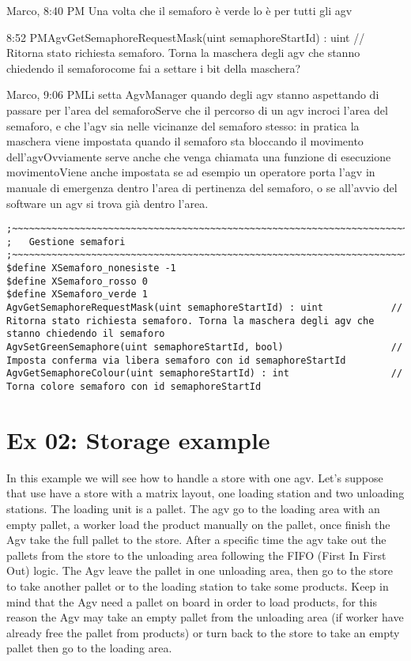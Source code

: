 Marco, 
8:40 PM Una volta che il semaforo è verde lo è per tutti gli agv

8:52 PMAgvGetSemaphoreRequestMask(uint semaphoreStartId) : uint	// Ritorna stato richiesta semaforo. Torna la maschera degli agv che stanno chiedendo il semaforocome fai a settare i bit della maschera?

Marco, 
9:06 PMLi setta AgvManager quando degli agv stanno aspettando di passare per l'area del semaforoServe che il percorso di un agv incroci l'area del semaforo, e che l'agv sia nelle vicinanze del semaforo stesso: in pratica la maschera viene impostata quando il semaforo sta bloccando il movimento dell'agvOvviamente serve anche che venga chiamata una funzione di esecuzione movimentoViene anche impostata se ad esempio un operatore porta l'agv in manuale di emergenza dentro l'area di pertinenza del semaforo, o se all'avvio del software un agv si trova già dentro l'area.

\begin{lstlisting}[caption= Semaphores functions and constants]
;~~~~~~~~~~~~~~~~~~~~~~~~~~~~~~~~~~~~~~~~~~~~~~~~~~~~~~~~~~~~~~~~~~~~~~~~~~~~~~~
;	Gestione semafori
;~~~~~~~~~~~~~~~~~~~~~~~~~~~~~~~~~~~~~~~~~~~~~~~~~~~~~~~~~~~~~~~~~~~~~~~~~~~~~~~
$define XSemaforo_nonesiste -1
$define XSemaforo_rosso 0
$define XSemaforo_verde 1
AgvGetSemaphoreRequestMask(uint semaphoreStartId) : uint			// Ritorna stato richiesta semaforo. Torna la maschera degli agv che stanno chiedendo il semaforo
AgvSetGreenSemaphore(uint semaphoreStartId, bool)					// Imposta conferma via libera semaforo con id semaphoreStartId
AgvGetSemaphoreColour(uint semaphoreStartId) : int					// Torna colore semaforo con id semaphoreStartId
\end{lstlisting}

\section{Ex 02: Storage example}
In this example we will see how to handle a store with one agv. Let's suppose that use have a store with a matrix layout, one loading station and two unloading stations.
The loading unit is a pallet. The agv go to the loading area with an empty pallet, a worker load the product manually on the pallet, once finish the Agv take the full pallet to the store. After a specific time the agv take out the pallets from the store to the unloading area following the FIFO (First In First Out) logic. The Agv leave the pallet in one unloading area, then go to the store to take another pallet or to the loading station to take some products. Keep in mind that the Agv need a pallet on board in order to load products, for this reason the Agv may take an empty pallet from the unloading area (if worker have already free the pallet from products) or turn back to the store to take an empty pallet then go to the loading area.

